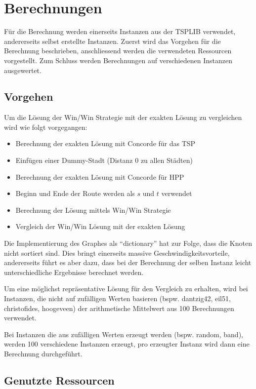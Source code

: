 \documentclass[11pt,a4paper]{article}
\begin{document}
\section{Berechnungen}
Für die Berechnung werden einerseits Instanzen aus der TSPLIB verwendet, andererseits selbst erstellte Instanzen.
Zuerst wird das Vorgehen für die Berechnung beschrieben, anschliessend werden die verwendeten Ressourcen vorgestellt. Zum Schluss werden Berechnungen auf verschiedenen Instanzen ausgewertet.

\subsection{Vorgehen}
Um die Lösung der Win/Win Strategie mit der exakten Lösung zu vergleichen wird wie folgt vorgegangen:

\begin{itemize}
    \item Berechnung der exakten Lösung mit Concorde für das TSP 
    \item Einfügen einer Dummy-Stadt (Distanz 0 zu allen Städten)
    \item Berechnung der exakten Lösung mit Concorde für HPP 
    \item Beginn und Ende der Route werden als $s$ und $t$ verwendet
    \item Berechnung der Lösung mittels Win/Win Strategie
    \item Vergleich der Win/Win Lösung mit der exakten Lösung
\end{itemize}

Die Implementierung des Graphes als "`dictionary"' hat zur Folge, dass die Knoten nicht sortiert sind. Dies bringt einerseits massive Geschwindigkeitsvorteile, andererseits führt es aber dazu, dass bei der Berechnung der selben Instanz leicht unterschiedliche Ergebnisse berechnet werden.

Um eine möglichst repräsentative Lösung für den Vergleich zu erhalten, wird bei Instanzen, die nicht auf zufälligen Werten basieren (bspw. dantzig42, eil51, christofides, hoogeveen) der arithmetische Mittelwert aus 100 Berechnungen verwendet.

Bei Instanzen die aus zufälligen Werten erzeugt werden (bspw. random, band), werden 100 verschiedene Instanzen erzeugt, pro erzeugter Instanz wird dann eine Berechnung durchgeführt.

\subsection{Genutzte Ressourcen}
\end{document}
